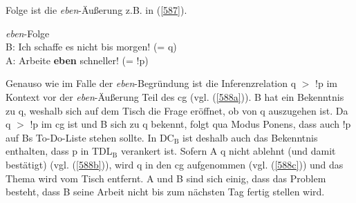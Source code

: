 Folge ist die \textit{eben}-Äußerung z.B. in (\ref{587}).

\begin{exe}
	\ex\label{587} \textit{eben}-Folge\\
	B: Ich schaffe es nicht bis morgen! (= q)\\
	A: Arbeite \textbf{eben} schneller! (= !p)
\end{exe}	
Genauso wie im Falle der \textit{eben}-Begründung ist die Inferenzrelation q $>$ !p im Kontext vor der \textit{eben}-Äußerung Teil des cg (vgl. (\ref{588a})). B hat ein Bekenntnis zu q, weshalb sich auf dem Tisch die Frage eröffnet, ob von q auszugehen ist. Da q $>$ !p im cg ist und B sich zu q bekennt, folgt qua  Modus Ponens, dass auch !p auf Bs To-Do-Liste stehen sollte. In DC$_{\textrm{B}}$ ist deshalb auch das Bekenntnis enthalten, dass p in TDL$_{\textrm{B}}$ verankert ist. Sofern A q nicht ablehnt (und damit bestätigt) (vgl. (\ref{588b})), wird q in den cg aufgenommen (vgl. (\ref{588c})) und das Thema wird vom Tisch entfernt. A und B sind sich einig, dass das Problem besteht, dass B seine Arbeit nicht bis zum nächsten Tag fertig stellen wird.

